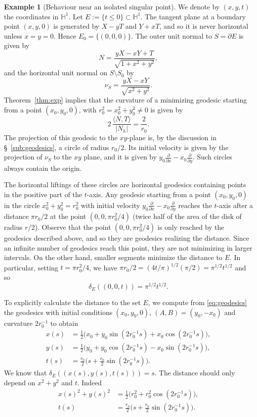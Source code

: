 \documentclass[10pt]{amsart}
\theoremstyle{definition}
\newtheorem{example}[theorem]{Example}
\theoremstyle{remark}
\numberwithin{equation}{section}
\begin{document}
\begin{example}[Behaviour near an isolated singular point]
\label{ex:isolated}
We denote by $(x,y,t)$ the coordinates in ${{\mathbb{H}}}^1$. Let $E:=\{t{\leqslant} 0\}\subset{{\mathbb{H}}}^1$. The tangent plane at a boundary point $(x,y,0)$ is generated by $X-yT$ and $Y+xT$, and so it is never horizontal unless $x=y=0$. Hence $E_0=\{(0,0,0)\}$. The outer unit normal to $S={\partial} E$ is given by
\[
N=\frac{yX-xY+T}{\sqrt{1+x^2+y^2}},
\]
and the horizontal unit normal on $S\setminus S_0$ by
\[
\nu_S=\frac{yX-xY}{\sqrt{x^2+y^2}}.
\]
Theorem~\ref{thm:exp} implies that the curvature of a minimizing geodesic starting from a point $(x_0,y_0,0)$, with $r_0^2=x_0^2+y_0^2\neq 0$ is given by
\[
2\,\frac{{\langle{N,T}\rangle}}{|N_{h}|}=\frac{2}{r_0}.
\]
The projection of this geodesic to the $xy$-plane is, by the discussion in \S~\ref{sub:geodesics}, a circle of radius $r_0/2$. Its initial velocity is given by the projection of $\nu_S$ to the $xy$ plane, and it is given by $y_0\tfrac{\partial}{{\partial} x}-x_0\tfrac{\partial}{{\partial} y}$. Such circles always contain the origin.

The horizontal liftings of these circles are horizontal geodesics containing points in the positive part of the $t$-axis. Any geodesic starting from a point $(x_0,y_0,0)$ in the circle $x_0^2+y_0^2=r_0^2$ with initial velocity $y_0\tfrac{\partial}{{\partial} x}-x_0\tfrac{\partial}{{\partial} y}$ reaches the $t$-axis after a distance $\pi r_0/2$ at the point $(0,0,\pi r_0^2/4)$ (twice half of the area of the disk of radius $r/2$). Observe that the point $(0,0,\pi r_0^2/4)$ is only reached by the geodesics described above, and so they are geodesics realizing the distance. Since an infinite number of geodesics reach this point, they are not minimizing in larger intervals. On the other hand, smaller segments minimize the distance to $E$. In particular, setting $t=\pi r_0^2/4$, we have $\pi r_0/2=(4t/\pi)^{1/2}(\pi/2)=\pi^{1/2}t^{1/2}$ and so
\[
\delta_E((0,0,t))=\pi^{1/2}t^{1/2}.
\]

To explicitly calculate the distance to the set $E$, we compute from \eqref{eq:geodesics} the geodesics with initial conditions $(x_0,y_0,0)$, $(A,B)=(y_0,-x_0)$ and curvature $2r_0^{-1}$ to obtain
\begin{align*}
x(s)&=\frac{1}{2}\big(x_0+y_0\sin(2r_0^{-1}s)+x_0\cos(2r_0^{-1}s)\big),
\\
y(s)&=\frac{1}{2}\big(y_0+y_0\cos(2r_0^{-1}s)-x_0\sin(2r_0^{-1}s)\big),
\\
t(s)&=\frac{r_0}{2}\big(s+\frac{r_0}{2}\sin(2r_0^{-1}s)\big).
\end{align*}
We know that $\delta_E((x(s),y(s),t(s)))=s$. The distance should only depend on $x^2+y^2$ and $t$. Indeed
\begin{align*}
x(s)^2+y(s)^2&=\frac{1}{2}\big(r_0^2+r_0^2\cos(2r_0^{-1}s)\big),
\\
t(s)&=\frac{r_0}{2}\big(s+\frac{r_0}{2}\sin(2r_0^{-1}s)\big).
\end{align*}
\end{example}
\end{document}
